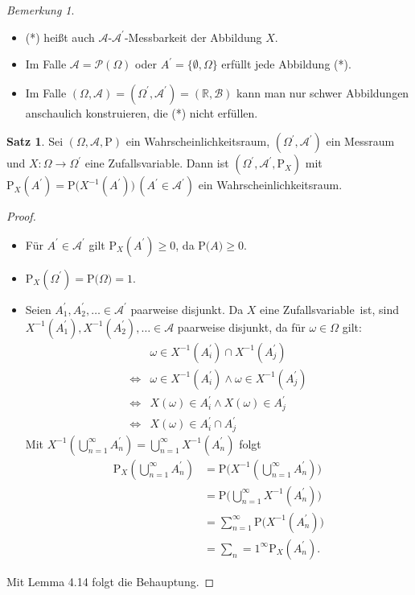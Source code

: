 \documentclass[a4paper,12pt,fleqn]{scrartcl}
\newcommand{\R}{\mathbb{R}}
\newcommand{\m}[1]{\mathcal{ #1 }}
\newcommand{\p}[1]{\text{P(} #1 \text{)}}
\newcommand{\WR}{Wahrscheinlichkeitsraum}
\newcommand{\ZV}{Zufallsvariable}
\theoremstyle{definition}
\newtheorem{satz}[definition]{Satz}
\theoremstyle{plain}
\theoremstyle{remark}
\newtheorem*{bemerkung}{Bemerkung}
\begin{document}
\begin{bemerkung}
\begin{itemize}
\item (*) heißt auch $\m{A}$-$\m{A}^\prime$-Messbarkeit der Abbildung $X$.
\item Im Falle $\m{A} = \m{P}( \Omega )$ oder $A^\prime = \{ \emptyset , \Omega \}$ erfüllt jede Abbildung (*).
\item Im Falle $( \Omega , \m{A}) = ( \Omega^\prime , \m{A}^\prime) = ( \R , \m{B} ) $ kann man nur schwer Abbildungen \glqq anschaulich konstruieren\grqq, die (*) nicht erfüllen.
\end{itemize}
\end{bemerkung}
\begin{satz}
Sei $( \Omega , \m{A} , \text{P})$ ein \WR , $(\Omega^\prime, \m{A}^\prime)$ ein Messraum und $X : \Omega \rightarrow \Omega^\prime$ eine \ZV. Dann ist $( \Omega^\prime , \m{A}^\prime , \text{P}_X) $ mit $\text{P}_X(A^\prime) = \p{X^{-1}(A^\prime)} \, ( A^\prime \in \m{A}^\prime ) $ ein \WR.
\end{satz}
\begin{proof}
\begin{itemize}
\item Für $ A^\prime \in \m{A}^\prime$ gilt $\text{P}_X(A^\prime) \geq 0 $, da $\p{A} \geq 0$.
\item $\text{P}_X(\Omega^\prime ) = \p{\Omega} = 1$.
\item Seien $A_1^\prime, A_2^\prime, \ldots \in \m{A}^\prime $ paarweise disjunkt. Da $X$ eine \ZV \, ist, sind $X^{-1}(A_1^\prime), X^{-1}(A_2^\prime), \ldots \in \m{A}$ paarweise disjunkt, da für $ \omega \in \Omega $ gilt: 
\begin{align*}
&\omega \in X^{-1}(A_i^\prime) \cap X^{-1}(A_j^\prime) \\
\Leftrightarrow &\omega \in X^{-1}(A_i^\prime) \land \omega \in X^{-1}(A_j^\prime) \\
\Leftrightarrow &X(\omega) \in A_i^\prime \land X(\omega) \in A_j^\prime \\
\Leftrightarrow &X(\omega) \in A_i^\prime \cap A_j^\prime
\end{align*} 
Mit $X^{-1}( \bigcup_{n=1}^{ \infty }{A_n^\prime} ) = \bigcup_{n=1}^{ \infty }{X^{-1}(A_n^\prime)}$ folgt
\begin{align*}
\text{P}_X(\bigcup_{n=1}^{ \infty }{A_n^\prime}) &= \p{X^{-1} (\bigcup_{n=1}^{ \infty }{A_n^\prime})} \\
&= \p{\bigcup_{n=1}^{ \infty }{X^{-1}(A_n^\prime)}} \\
&= \sum_{n=1}^{\infty}\p{X^{-1}(A_n^\prime)} \\
&= \sum_n=1^\infty {\text{P}_X(A_n^\prime)}.
\end{align*}
\end{itemize}
Mit Lemma 4.14 folgt die Behauptung.
\end{proof}
\end{document}
